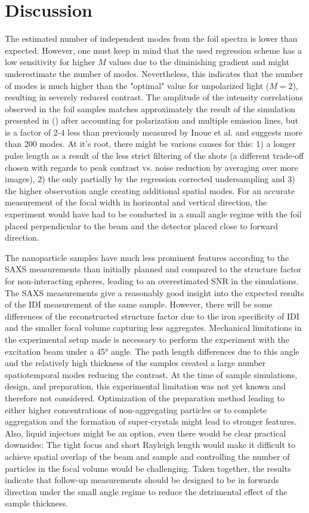 \section{Discussion}

The estimated number of independent modes from the foil spectra is lower than expected. However, one must keep in mind that the used regression scheme has a low sensitivity for higher $M$ values due to the diminishing gradient and might underestimate the number of modes. Nevertheless, this indicates that the number of modes is much higher than the "optimal" value for unpolarized light ($M=2$), resulting in severely reduced contrast. The amplitude of the intensity correlations observed in the foil samples matches approximately the result of the simulation presented in   () after accounting for polarization and multiple emission lines, but is a factor of 2-4 less than previously measured by Inoue et al. and suggests more than 200 modes. At it's root, there might be various causes for this: 1) a longer pulse length as a result of the less strict filtering of the shots (a different trade-off chosen with regards to peak contrast vs. noise reduction by averaging over more images), 2) the only partially by the regression corrected undersampling and 3) the higher observation angle creating additional spatial modes. For an accurate measurement of the focal width in horizontal and vertical direction, the experiment would have had to be conducted in a small angle regime with the foil placed perpendicular to the beam and the detector placed close to forward direction.

The nanoparticle samples have much less prominent features according to the SAXS measurements than initially planned and compared to the structure factor for non-interacting spheres, leading to an overestimated SNR in the simulations. The SAXS measurements give a reasonably good insight into the expected results of the IDI measurement of the same sample. However, there will be some differences  of the reconstructed structure factor due to the iron specificity of IDI and the smaller focal volume capturing less aggregates. Mechanical limitations in the experimental setup made is necessary to perform the experiment with the excitation beam under a 45° angle. The path length differences due to this angle and the relatively high thickness of the samples created a large number spatiotemporal modes reducing the contrast. At the time of sample simulations, design, and preparation, this experimental limitation was not yet known and therefore not considered.
Optimization of the preparation method leading to either higher concentrations of non-aggregating particles or to complete aggregation and the formation of super-crystals might lead to stronger features. Also, liquid injectors might be an option, even there would be clear practical downsides: The tight focus and short Rayleigh length would make it difficult to achieve spatial overlap of the beam and sample and controlling the number of particles in the focal volume would be challenging. Taken together, the results indicate that follow-up measurements should be designed to be in forwards direction under the small angle regime to reduce the detrimental effect of the sample thickness.

